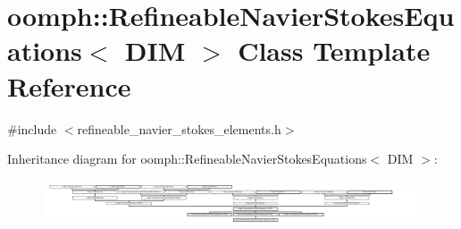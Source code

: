 \hypertarget{classoomph_1_1RefineableNavierStokesEquations}{}\section{oomph\+:\+:Refineable\+Navier\+Stokes\+Equations$<$ D\+IM $>$ Class Template Reference}
\label{classoomph_1_1RefineableNavierStokesEquations}


{\ttfamily \#include $<$refineable\+\_\+navier\+\_\+stokes\+\_\+elements.\+h$>$}

Inheritance diagram for oomph\+:\+:Refineable\+Navier\+Stokes\+Equations$<$ D\+IM $>$\+:\begin{figure}[H]
\begin{center}
\leavevmode
\includegraphics[height=1.361111cm]{classoomph_1_1RefineableNavierStokesEquations}
\end{center}
\end{figure}
